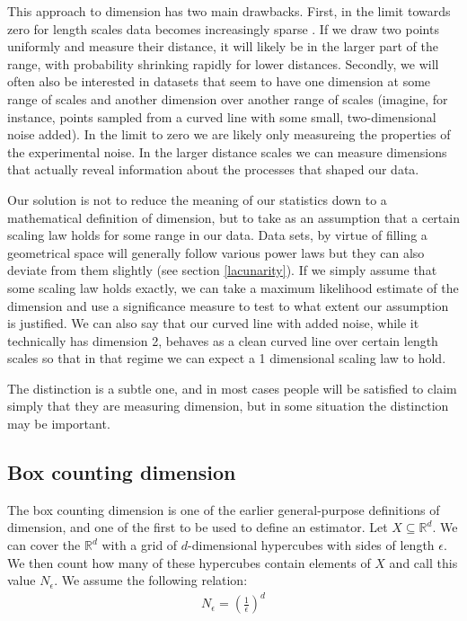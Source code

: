 \documentclass[11pt]{article}
\begin{document}
This approach to dimension has two main drawbacks. First, in the limit towards zero for length scales data becomes increasingly sparse . If we draw two points uniformly and measure their distance, it will likely be in the larger part of the range, with probability shrinking rapidly for lower distances. Secondly, we will often also be interested in datasets that seem to have one dimension at some range of scales and another dimension over another range of scales (imagine, for instance, points sampled from a curved line with some small, two-dimensional noise added). In the limit to zero we are likely only measureing the properties of the experimental noise. In the larger distance scales we can measure dimensions that actually reveal information about the processes that shaped our data.

Our solution is not to reduce the meaning of our statistics down to a mathematical definition of dimension, but to take as an assumption that a certain scaling law holds for some range in our data. Data sets, by virtue of filling a geometrical space will generally follow various power laws but they can also deviate from them slightly (see section \ref{lacunarity}). If we simply assume that some scaling law holds exactly, we can take a maximum likelihood estimate of the dimension and use a significance measure to test to what extent our assumption is justified. We can also say that our curved line with added noise, while it technically has dimension 2, behaves as a clean curved line over certain length scales so that in that regime we can expect a 1 dimensional scaling law to hold.

The distinction is a subtle one, and in most cases people will be satisfied to claim simply that they are measuring dimension, but in some situation the distinction may be important.

\subsection{Box counting dimension}

The box counting dimension is one of the earlier general-purpose definitions of dimension, and one of the first to be used to define an estimator. Let $X \subseteq {\mathbb R}^d$. We can cover the ${\mathbb R}^d$ with a grid of $d$-dimensional hypercubes with sides of length $\epsilon$. We then count how many of these hypercubes contain elements of $X$ and call this value $N_\epsilon$. We assume the following relation:
\begin{align}
\label{box-counting-assumption}
N_\epsilon = \left (\frac{1}{\epsilon}\right) ^ d
\end{align}
\end{document}
